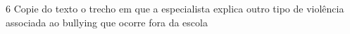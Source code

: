 \coment{%
}

\num{6} Copie do texto o trecho em que a especialista explica outro tipo de violência associada ao bullying que ocorre fora da escola

